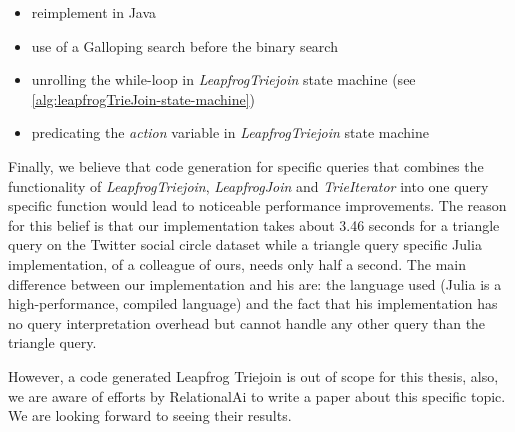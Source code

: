 \begin{itemize}
    \item reimplement in Java
    \item use of a Galloping search before the binary search
    \item unrolling the while-loop in \textit{LeapfrogTriejoin} state machine (see \cref{alg:leapfrogTrieJoin-state-machine})
    \item predicating the \textit{action} variable in \textit{LeapfrogTriejoin} state machine
\end{itemize}

Finally, we believe that code generation for specific queries that combines the functionality of \textit{LeapfrogTriejoin}, \textit{LeapfrogJoin}
and \textit{TrieIterator} into one query specific function would lead to noticeable performance improvements.
The reason for this belief is that our implementation takes about 3.46 seconds for a triangle query on the Twitter social circle dataset
while a triangle query specific Julia implementation, of a colleague of ours, needs only half a second.
The main difference between our implementation and his are: the language used (Julia is a high-performance, compiled language) and the fact
that his implementation has no query interpretation overhead but cannot handle any other query than the triangle query.

However, a code generated Leapfrog Triejoin is out of scope for this thesis, also, we are aware of efforts by RelationalAi to
write a paper about this specific topic.
We are looking forward to seeing their results.




